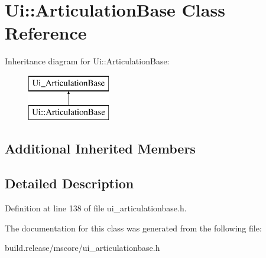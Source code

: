 \hypertarget{class_ui_1_1_articulation_base}{}\section{Ui\+:\+:Articulation\+Base Class Reference}
\label{class_ui_1_1_articulation_base}
Inheritance diagram for Ui\+:\+:Articulation\+Base\+:\begin{figure}[H]
\begin{center}
\leavevmode
\includegraphics[height=2.000000cm]{class_ui_1_1_articulation_base}
\end{center}
\end{figure}
\subsection*{Additional Inherited Members}


\subsection{Detailed Description}


Definition at line 138 of file ui\+\_\+articulationbase.\+h.



The documentation for this class was generated from the following file\+:\begin{DoxyCompactItemize}
\item 
build.\+release/mscore/ui\+\_\+articulationbase.\+h\end{DoxyCompactItemize}
